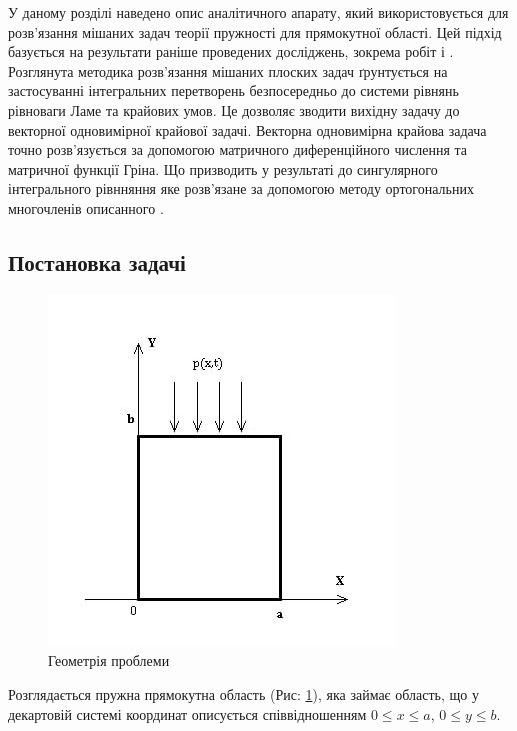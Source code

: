 У даному розділі наведено опис аналітичного апарату, який використовується для розв'язання мішаних задач теорії пружності для прямокутної області.
Цей підхід базується на результати раніше проведених досліджень, зокрема робіт \cite{popov_1} і \cite{popov_2}.
Розглянута методика розв'язання мішаних плоских задач ґрунтується на застосуванні інтегральних перетворень безпосередньо до системи рівнянь рівноваги Ламе та крайових умов.
Це дозволяє зводити вихідну задачу до векторної одновимірної крайової задачі.
Векторна одновимірна крайова задача точно розв'язується за допомогою матричного диференційного числення та матричної функції Гріна.
Що призводить у результаті до сингулярного інтегрального рівнняння яке розв'язане за допомогою методу ортогональних многочленів описанного \cite{popov_3}.

\subsection{Постановка задачі}
\begin{figure}[h]
    \begin{center}
        \includegraphics[scale=1]{images/geometry/image_4.jpg}
    \end{center}
    \caption{Геометрія проблеми}\label{geom_gen}
\end{figure}
Розглядається пружна прямокутна область (Рис: \ref{geom_gen}), яка займає область, що у декартовій системі координат описується співвідношенням $0 \le x \le a$, $0 \le y \le b$.

